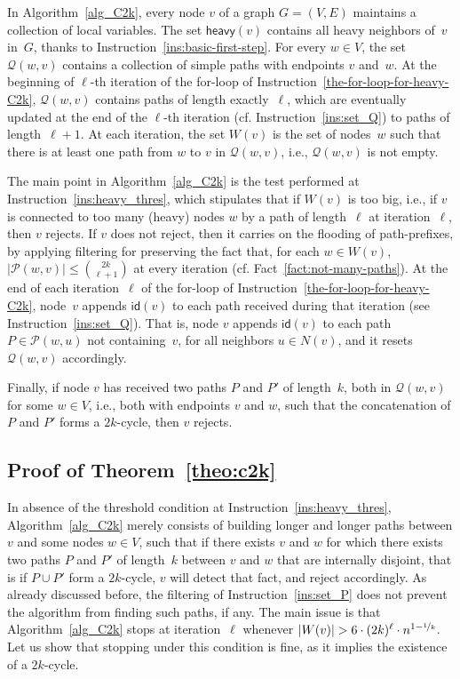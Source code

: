 \documentclass{article}
\newcommand{\lebontau}{6\cdot (2k)^\ell}
\newcommand{\id}{\mathsf{id}}
\begin{document}
In Algorithm~\ref{alg_C2k}, every node $v$ of a graph $G=(V,E)$ maintains a collection of local variables. The set $\mathsf{heavy}(v)$ contains all heavy neighbors of~$v$ in~$G$, thanks to Instruction~\ref{ins:basic-first-step}. For every $w\in V$, the set $\mathcal{Q}(w,v)$ contains a collection of simple paths with endpoints $v$ and~$w$. At the beginning of $\ell$-th iteration of the for-loop of Instruction~\ref{the-for-loop-for-heavy-C2k}, $\mathcal{Q}(w,v)$ contains paths of length exactly~$\ell$, which are eventually updated at the end of the $\ell$-th iteration (cf. Instruction~\ref{ins:set_Q}) to paths of length~$\ell+1$. At each iteration, the set $W(v)$ is the set of nodes~$w$ such that there is at least one path from $w$ to $v$ in $\mathcal{Q}(w,v)$, i.e., $\mathcal{Q}(w,v)$ is not empty. 

The main point in Algorithm~\ref{alg_C2k} is the test performed at Instruction~\ref{ins:heavy_thres}, which stipulates that if $W(v)$ is too big, i.e., if $v$ is connected to too many (heavy) nodes $w$ by a path of length~$\ell$ at iteration~$\ell$, then $v$ rejects. If $v$ does not reject, then it carries on the flooding of path-prefixes, by applying filtering for preserving the fact that, for each $w\in W(v)$, $|\mathcal{P}(w,v)|\leq \binom{2k}{\ell+1}$ at every iteration (cf. Fact~\ref{fact:not-many-paths}). At the end of each iteration~$\ell$ of the for-loop of Instruction~\ref{the-for-loop-for-heavy-C2k}, node~$v$ appends $\id(v)$ to each path received during that iteration (see Instruction~\ref{ins:set_Q}). That is, node $v$ appends $\id(v)$ to each path $P\in \mathcal{P}(w,u)$ not containing~$v$, for all neighbors $u\in N(v)$, and it resets $\mathcal{Q}(w,v)$ accordingly. 

Finally, if node $v$ has received two paths $P$ and $P'$ of length~$k$, both in $\mathcal{Q}(w,v)$ for some $w\in V$, i.e., both with endpoints $v$ and $w$, such that the concatenation of $P$ and $P'$ forms a $2k$-cycle, then $v$ rejects. 

\subsection{Proof of Theorem~\ref{theo:c2k}}

In absence of the threshold condition at Instruction~\ref{ins:heavy_thres}, Algorithm~\ref{alg_C2k} merely consists of building longer and longer paths between $v$ and some nodes $w\in V$, such that if there exists $v$ and $w$ for which there exists two paths $P$ and $P'$ of length~$k$ between $v$ and $w$ that are internally disjoint, that is if $P\cup P'$ form a $2k$-cycle, $v$ will detect that fact, and reject accordingly. As already discussed before, the filtering of Instruction~\ref{ins:set_P} does not prevent the algorithm from finding such paths, if any. The main issue is that Algorithm~\ref{alg_C2k}  stops at iteration~$\ell$ whenever $|W(v)|> \lebontau \cdot n^{1-\nicefrac{1}{k}}$. Let us show that stopping under this condition is fine, as it implies the existence of a $2k$-cycle. 
\end{document}

